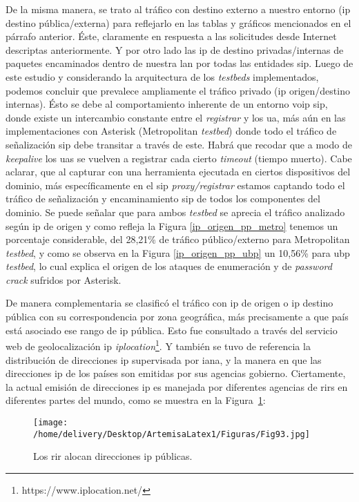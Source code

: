 \documentclass[a4paper,12pt]{report}
\begin{document}
{De la misma manera, se trato al tráfico con destino externo a nuestro entorno (\ac{ip} destino
pública/externa) para reflejarlo en las tablas y gráficos mencionados en el párrafo anterior.
Éste, claramente en respuesta a las solicitudes desde Internet descriptas anteriormente. Y por otro
lado las \ac{ip} de destino privadas/internas de paquetes encaminados dentro de
nuestra \ac{lan} por todas las entidades \ac{sip}. Luego de este estudio y considerando la
arquitectura de los \emph{testbeds} implementados, podemos concluir que prevalece
ampliamente el tráfico privado (\ac{ip} origen/destino internas). Ésto se debe al
comportamiento inherente de un entorno \ac{voip} \ac{sip}, donde existe un intercambio
constante entre el \emph{registrar} y los \ac{ua}, más aún en las implementaciones con
Asterisk (Metropolitan \emph{testbed}) donde todo el tráfico de señalización \ac{sip} debe
transitar a través de este. Habrá que recodar que a modo de \emph{keepalive} los \ac{ua}s
se vuelven a registrar cada cierto \emph{timeout} (tiempo muerto). Cabe aclarar, que
al capturar con una herramienta ejecutada en ciertos dispositivos del dominio, más específicamente
en el \ac{sip} \emph{proxy/registrar}
estamos captando todo el tráfico de señalización y encaminamiento \ac{sip} de todos
los componentes del dominio. Se puede señalar que para ambos \emph{testbed} se aprecia el
tráfico analizado según \ac{ip} de origen y como refleja la Figura \ref{ip_origen_pp_metro} tenemos un
porcentaje considerable, del 28,21\% de tráfico público/externo para Metropolitan \emph{testbed}, y como se
observa en la Figura \ref{ip_origen_pp_ubp} un 10,56\% para \ac{ubp} \emph{testbed},
lo cual explica el origen de los ataques de enumeración y de \emph{password crack} sufridos por Asterisk. 

De manera complementaria se clasificó el tráfico con \ac{ip} de origen o \ac{ip} destino
pública con su correspondencia por zona geográfica, más precisamente a que país
está asociado ese rango de \ac{ip} pública. Esto fue consultado a través del servicio web de 
geolocalización \ac{ip} 
\emph{iplocation}\footnote{https://www.iplocation.net/}. Y también se tuvo de referencia la distribución de direcciones \ac{ip}
supervisada por \ac{iana}, y la manera en que las direcciones \ac{ip} de los países son emitidas por sus
agencias gobierno. Ciertamente, la actual emisión de direcciones \ac{ip} es manejada por
diferentes agencias de \ac{rir}s en diferentes partes del mundo, como se muestra en la
Figura~\ref{iana_rir}:
\cite{hundley}  

\begin{figure}[h!] 
\centering
\texttt{[image: /home/delivery/Desktop/ArtemisaLatex1/Figuras/Fig93.jpg]}
\caption{Los \ac{rir} alocan direcciones \ac{ip} públicas. \cite{hundley}}
\label{iana_rir}
\end{figure}

}
\end{document}
